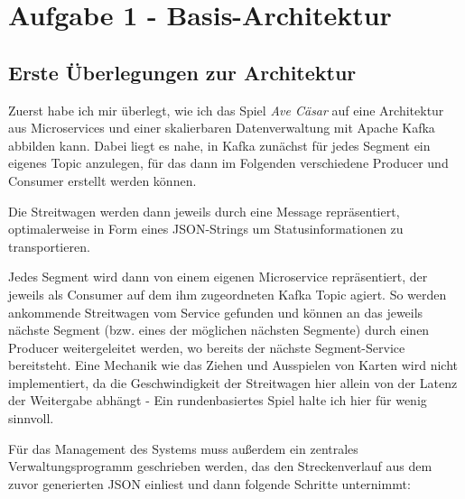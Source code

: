 \documentclass[12pt]{article}
\date{}
\begin{document}
	
\section*{Aufgabe 1 - Basis-Architektur}
\subsection*{Erste Überlegungen zur Architektur}
Zuerst habe ich mir überlegt, wie ich das Spiel \emph{Ave Cäsar} auf eine Architektur aus Microservices und einer skalierbaren Datenverwaltung mit Apache Kafka abbilden kann.
Dabei liegt es nahe, in Kafka zunächst für jedes Segment ein eigenes Topic anzulegen, für das dann im Folgenden verschiedene Producer und Consumer erstellt werden können.

Die Streitwagen werden dann jeweils durch eine Message repräsentiert, optimalerweise in Form eines JSON-Strings um Statusinformationen zu transportieren.

Jedes Segment wird dann von einem eigenen Microservice repräsentiert, der jeweils als Consumer auf dem ihm zugeordneten Kafka Topic agiert.
So werden ankommende Streitwagen vom Service gefunden und können an das jeweils nächste Segment (bzw. eines der möglichen nächsten Segmente) durch einen Producer weitergeleitet werden, wo bereits der nächste Segment-Service bereitsteht.
Eine Mechanik wie das Ziehen und Ausspielen von Karten wird nicht implementiert, da die Geschwindigkeit der Streitwagen hier allein von der Latenz der Weitergabe abhängt - Ein rundenbasiertes Spiel halte ich hier für wenig sinnvoll.

Für das Management des Systems muss außerdem ein zentrales Verwaltungsprogramm geschrieben werden, das den Streckenverlauf aus dem zuvor generierten JSON einliest und dann folgende Schritte unternimmt:
\end{document}
